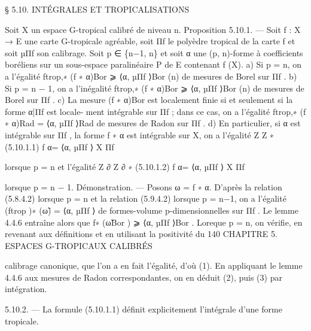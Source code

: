 \documentclass[
  10pt,
]{article}
\newenvironment{Shaded}{}{}
\newcommand{\NormalTok}[1]{#1}
\begin{document}
\begin{Shaded}
\begin{Highlighting}[]

\NormalTok{               § 5.10. INTÉGRALES ET TROPICALISATIONS}

\NormalTok{  Soit X un espace G{-}tropical calibré de niveau n.}
\NormalTok{Proposition 5.10.1. — Soit f : X → E une carte G{-}tropicale agréable, soit Πf le}
\NormalTok{polyèdre tropical de la carte f et soit µΠf son calibrage.}
\NormalTok{  Soit p ∈ \{n−1, n\} et soit α une (p, n){-}forme à coefficients boréliens sur un sous{-}espace}
\NormalTok{paralinéaire P de E contenant f (X).}
\NormalTok{  a) Si p = n, on a l’égalité}
\NormalTok{                                   ftrop,∗ (f ∗ α)Bor ⩾ ⟨α, µΠf ⟩Bor}
\NormalTok{                             (n)}
\NormalTok{de mesures de Borel sur Πf .}
\NormalTok{  b) Si p = n − 1, on a l’inégalité}
\NormalTok{                                   ftrop,∗ (f ∗ α)Bor ⩾ ⟨α, µΠf ⟩Bor}
\NormalTok{                             (n)}
\NormalTok{de mesures de Borel sur Πf .}
\NormalTok{  c) La mesure (f ∗ α)Bor est localement finie si et seulement si la forme α|Πf est locale{-}}
\NormalTok{ment intégrable sur Πf ; dans ce cas, on a l’égalité}
\NormalTok{                                   ftrop,∗ (f ∗ α)Rad = ⟨α, µΠf ⟩Rad}
\NormalTok{de mesures de Radon sur Πf .}
\NormalTok{   d) En particulier, si α est intégrable sur Πf , la forme f ∗ α est intégrable sur X, on a}
\NormalTok{l’égalité}
\NormalTok{                                   Z         Z}
\NormalTok{                                        ∗}
\NormalTok{(5.10.1.1)                            f α=       ⟨α, µΠf ⟩}
\NormalTok{                                        X           Πf}

\NormalTok{lorsque p = n et l’égalité}
\NormalTok{                                      Z ∂          Z ∂}
\NormalTok{                                            ∗}
\NormalTok{(5.10.1.2)                                  f α=         ⟨α, µΠf ⟩}
\NormalTok{                                        X           Πf}

\NormalTok{lorsque p = n − 1.}
\NormalTok{Démonstration. — Posons ω = f ∗ α. D’après la relation (5.8.4.2) lorsque p = n et la}
\NormalTok{relation (5.9.4.2) lorsque p = n−1, on a l’égalité (ftrop )∗ (ω̃) = ⟨α, µΠf ⟩ de formes{-}volume}
\NormalTok{p{-}dimensionnelles sur Πf . Le lemme 4.4.6 entraîne alors que f∗ (ω̃Bor ) ⩾ ⟨α, µΠf ⟩Bor .}
\NormalTok{Loreque p = n, on vérifie, en revenant aux définitions et en utilisant la positivité du}
\NormalTok{140                   CHAPITRE 5. ESPACES G{-}TROPICAUX CALIBRÉS}

\NormalTok{calibrage canonique, que l’on a en fait l’égalité, d’où (1). En appliquant le lemme 4.4.6}
\NormalTok{aux mesures de Radon correspondantes, on en déduit (2), puis (3) par intégration.}

\NormalTok{5.10.2. — La formule (5.10.1.1) définit explicitement l’intégrale d’une forme tropicale.}
\end{Highlighting}
\end{Shaded}
\end{document}
